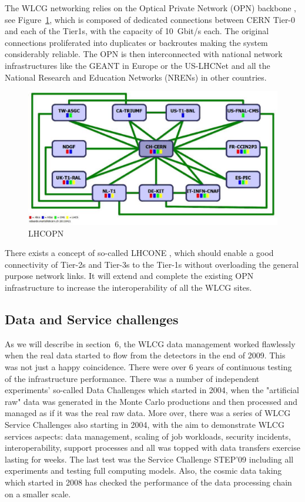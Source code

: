 The WLCG networking relies on the Optical Private Network (OPN)
backbone \cite{OPN}, see Figure~\ref{fig08}, which is composed of dedicated
connections between CERN Tier-0 and each of the Tier1s, with the
capacity of 10~Gbit/s each. The original connections proliferated
into duplicates or backroutes making the system considerably
reliable. The OPN is then interconnected with national network
infrastructures like the GEANT \cite{GEANT} in Europe or the US-LHCNet \cite{USLHCNET}
and all the National Research and Education Networks (NRENs) in
other countries.

\begin{figure}[htb] %
\centering
\includegraphics[width=13cm]{fig08.eps} %
\caption{LHCOPN}\label{fig08}
\end{figure}


There exists a concept of so-called LHCONE \cite{LHCONE}, which should enable
a good connectivity of Tier-2s and Tier-3s to the Tier-1s without
overloading the general purpose network links. It will extend and
complete the existing OPN infrastructure to increase the
interoperability of all the WLCG sites.

\subsection{Data and Service challenges}
%
As we will describe in section~6, the WLCG data management
worked flawlessly when the real data started
to flow from the detectors in the end of 2009. This was not just
a happy coincidence. There were over 6 years of continuous testing
of the infrastructure performance. There was a number of independent
experiments' so-called Data Challenges which started in 2004, when
the "artificial raw" data was generated in the Monte Carlo
productions and then processed and managed as if it was the real raw
data. More over,  there was a series of WLCG Service Challenges also
starting in 2004, with the aim to demonstrate WLCG services aspects:
data management, scaling of job workloads, security incidents,
interoperability, support processes and all was topped with data
transfers exercise lasting for weeks. The last test was the Service
Challenge STEP'09 including all experiments and testing full
computing models. Also, the cosmic data taking which started in 2008
has checked the performance of the data processing chain on a
smaller scale.

